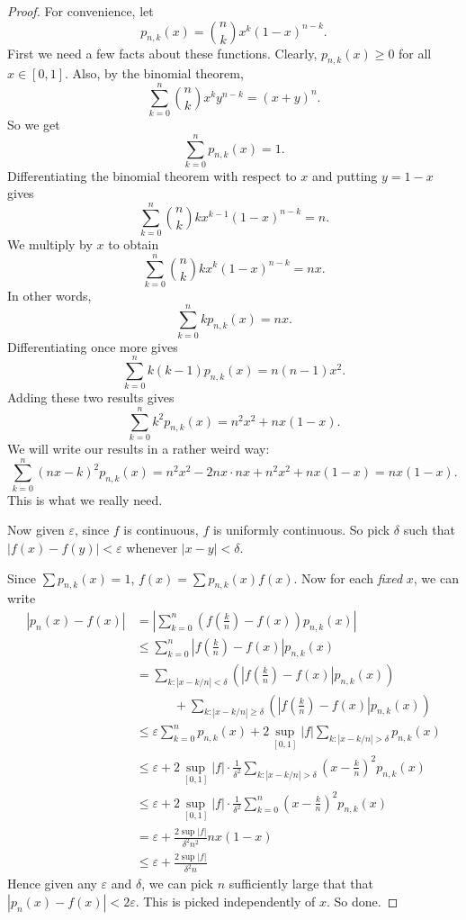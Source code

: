 \documentclass[a4paper]{article}
\begin{document}
\begin{proof}
  For convenience, let
  \[
    p_{n, k}(x) = \binom{n}{k}x^k (1 - x)^{n - k}.
  \]
  First we need a few facts about these functions. Clearly, $p_{n, k}(x) \geq 0$ for all $x\in [0, 1]$. Also, by the binomial theorem,
  \[
    \sum_{k = 0}^n \binom{n}{k}x^k y^{n - k} = (x + y)^n.
  \]
  So we get
  \[
    \sum_{k = 0}^n p_{n, k}(x) = 1.
  \]
  Differentiating the binomial theorem with respect to $x$ and putting $y = 1 - x$ gives
  \[
    \sum_{k = 0}^n \binom{n}{k}k x^{k - 1}(1 - x)^{n - k} = n.
  \]
  We multiply by $x$ to obtain
  \[
    \sum_{k = 0}^n \binom{n}{k}k x^k(1 - x)^{n - k} = nx.
  \]
  In other words,
  \[
    \sum_{k = 0}^n kp_{n, k}(x) = nx.
  \]
  Differentiating once more gives
  \[
    \sum_{k = 0}^n k(k - 1)p_{n, k}(x) = n(n - 1)x^2.
  \]
  Adding these two results gives
  \[
    \sum_{k = 0}^n k^2 p_{n, k}(x) = n^2 x^2 + nx(1 - x).
  \]
  We will write our results in a rather weird way:
  \[
    \sum_{k = 0}^n (nx - k)^2 p_{n, k}(x) = n^2 x^2 - 2nx \cdot nx + n^2 x^2 + nx(1 - x) = nx(1 - x).\tag{$*$}
  \]
  This is what we really need.

  Now given $\varepsilon$, since $f$ is continuous, $f$ is uniformly continuous. So pick $\delta$ such that $|f(x) - f(y)| < \varepsilon$ whenever $|x - y| < \delta$.

  Since $\sum p_{n, k}(x) = 1$, $f(x) = \sum p_{n, k}(x) f(x)$. Now for each \emph{fixed} $x$, we can write
  \begin{align*}
    |p_n(x) - f(x)| &= \left|\sum_{k = 0}^n \left(f\left(\frac{k}{n}\right) - f(x)\right) p_{n, k}(x)\right|\\
    &\leq \sum_{k = 0}^n \left|f\left(\frac{k}{n}\right) - f(x)\right| p_{n, k}(x)\\
    &= \sum_{k: |x - k/n| < \delta}\left(\left|f\left(\frac{k}{n}\right) - f(x)\right| p_{n, k}(x)\right) \\
    &\quad\quad\quad+ \sum_{k: |x - k/n| \geq \delta}\left(\left|f\left(\frac{k}{n}\right) - f(x)\right| p_{n, k}(x)\right)\\
    &\leq \varepsilon \sum_{k = 0}^n p_{n, k}(x) + 2\sup_{[0, 1]} |f| \sum_{k: |x - k/n| > \delta} p_{n, k}(x)\\
    &\leq \varepsilon + 2\sup_{[0, 1]} |f|\cdot \frac{1}{\delta^2}\sum_{k: |x - k/n| > \delta} \left(x - \frac{k}{n}\right)^2 p_{n, k}(x)\\
    &\leq \varepsilon + 2\sup_{[0, 1]} |f|\cdot \frac{1}{\delta^2}\sum_{k = 0}^n \left(x - \frac{k}{n}\right)^2 p_{n, k}(x)\\
    &= \varepsilon + \frac{2\sup|f|}{\delta^2 n^2} nx(1 - x)\\
    &\leq \varepsilon + \frac{2\sup|f|}{\delta^2 n}
  \end{align*}
  Hence given any $\varepsilon$ and $\delta$, we can pick $n$ sufficiently large that that $|p_n(x) - f(x)| < 2\varepsilon$. This is picked independently of $x$. So done.
\end{proof}
\end{document}
